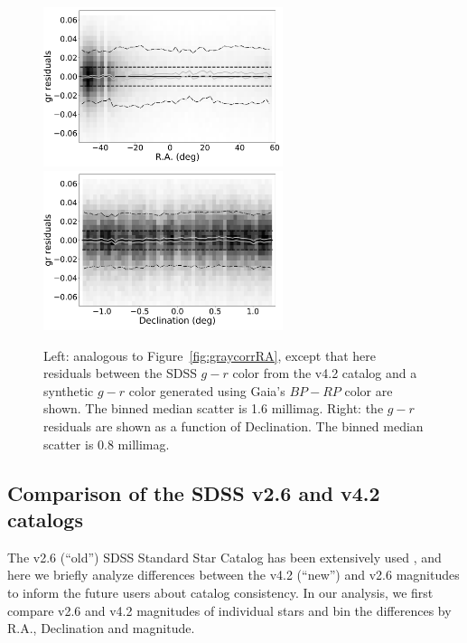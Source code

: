 \documentclass[fleqn,usenatbib]{mnras}
\begin{document}
\begin{figure}[th!]
    \centering\includegraphics[width=7cm]{figures/colorResidGaiaColors_gr_RA_Hess.png} 
    \centering\includegraphics[width=7cm]{figures/colorResidGaiaColors_gr_Dec_Hess.png} 
\caption{Left: analogous to Figure~\ref{fig:graycorrRA}, except that here residuals between
the SDSS $g-r$ color from the v4.2 catalog and a synthetic $g-r$ color generated using 
Gaia's $BP-RP$ color are shown. The binned median scatter is 1.6 millimag. Right: the 
$g-r$ residuals are shown as a function of Declination. The binned median scatter is 
0.8 millimag.}
\label{fig:grVSgaiaRADec}
\end{figure}
 



\subsection{Comparison of the SDSS v2.6 and v4.2 catalogs \label{sec:v26v34}} 

The v2.6 (``old'') SDSS Standard Star Catalog has been extensively used 
\citep[e.g.,][]{2008AJ....135..338F},
and here we briefly analyze differences between the v4.2 (``new'') and v2.6 magnitudes
to inform the future users about catalog consistency. 
In our analysis, we first compare v2.6 and v4.2 magnitudes of individual stars and 
bin the differences by R.A., Declination and magnitude. 
\end{document}

